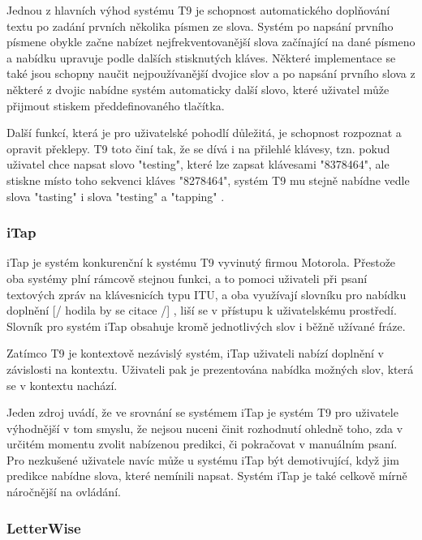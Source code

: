 \documentclass{article}
\begin{document}
Jednou z hlavních výhod systému T9 je schopnost automatického doplňování textu po zadání prvních několika písmen ze slova. Systém po napsání prvního písmene obykle začne nabízet nejfrekventovanější slova začínající na dané písmeno a nabídku upravuje podle dalších stisknutých kláves. Některé implementace se také jsou schopny naučit nejpoužívanější dvojice slov a po napsání prvního slova z některé z dvojic nabídne systém automaticky další slovo, které uživatel může přijmout stiskem předdefinovaného tlačítka. \cite{hrzQ70bvKjUBgVml} 

Další funkcí, která je pro uživatelské pohodlí důležitá, je schopnost rozpoznat a opravit překlepy. T9 toto činí tak, že se dívá i na přilehlé klávesy, tzn. pokud uživatel chce napsat slovo "testing", které lze zapsat klávesami "8378464", ale stiskne místo toho sekvenci kláves "8278464", systém T9 mu stejně nabídne vedle slova "tasting" i slova "testing" a "tapping" \cite{hrzQ70bvKjUBgVml}.

\subsubsection{iTap}

iTap je systém konkurenční k systému T9 vyvinutý firmou Motorola. Přestože oba systémy plní rámcově stejnou funkci, a to pomoci uživateli při psaní textových zpráv na klávesnicích typu ITU, a oba využívají slovníku pro nabídku doplnění 
[/ hodila by se citace /]
, liší se v přístupu k uživatelskému prostředí. Slovník pro systém iTap obsahuje kromě jednotlivých slov i běžně užívané fráze.

Zatímco T9 je kontextově nezávislý systém, iTap uživateli nabízí doplnění v závislosti na kontextu. Uživateli pak je prezentována nabídka možných slov, která se v kontextu nachází. 

Jeden zdroj \cite{lBNMeL7t9XcnqSzq} uvádí, že ve srovnání se systémem iTap je systém T9 pro uživatele výhodnější v tom smyslu, že nejsou nuceni činit rozhodnutí ohledně toho, zda v určitém momentu zvolit nabízenou predikci, či pokračovat v manuálním psaní. Pro nezkušené uživatele navíc může u systému iTap být demotivující, když jim predikce nabídne slova, které nemínili napsat. Systém iTap je také celkově mírně náročnější na ovládání.

\subsubsection{LetterWise}
\end{document}
